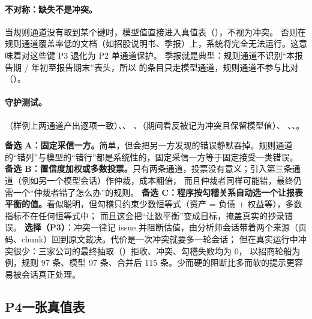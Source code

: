 \paragraph{不对称：缺失不是冲突。}当规则通道没有取到某个键时，模型值直接进入真值表（），不视为冲突。
否则在规则通道覆盖率低的文档（如招股说明书、季报）上，系统将完全无法运行。这意味着对这些键 P3 退化为 P2 单通道保护。
季报就是典型：规则通道不识别“本报告期 / 年初至报告期末”表头，所以  的条目只走模型通道，规则通道不参与比对（）。

\paragraph{守护测试。}（样例上两通道产出逐项一致）、、
、（期间看反被记为冲突且保留模型值）、
、、。

\begin{tradeoff}
\textbf{备选 A：固定采信一方。}简单，但会把另一方发现的错误静默吞掉。规则通道的“错列”与模型的“错行”都是系统性的，固定采信一方等于固定接受一类错误。
\textbf{备选 B：置信度加权或多数投票。}只有两条通道，投票没有意义；引入第三条通道（例如另一个模型会话）作仲裁，成本翻倍，
而且仲裁者同样可能错，最终仍需一个“仲裁者错了怎么办”的规则。
\textbf{备选 C：程序按勾稽关系自动选一个让报表平衡的值。}看似聪明，但勾稽只约束少数恒等式（资产 = 负债 + 权益等），多数指标不在任何恒等式中；
而且这会把“让数平衡”变成目标，掩盖真实的抄录错误。
\textbf{选择（P3）}：冲突一律记 issue 并阻断估值，由分析师会话带着两个来源（页码、chunk）回到原文裁决。代价是一次冲突就要多一轮会话；
但在真实运行中冲突很少：三家公司的最终抽取（）拒收、冲突、勾稽失败均为 0，
以招商轮船为例，规则 97 条、模型 97 条、合并后 115 条。少而硬的阻断比多而软的提示更容易被会话真正处理。
\end{tradeoff}

\subsection{P4\quad 一张真值表}
\label{sec:pr-p4}

